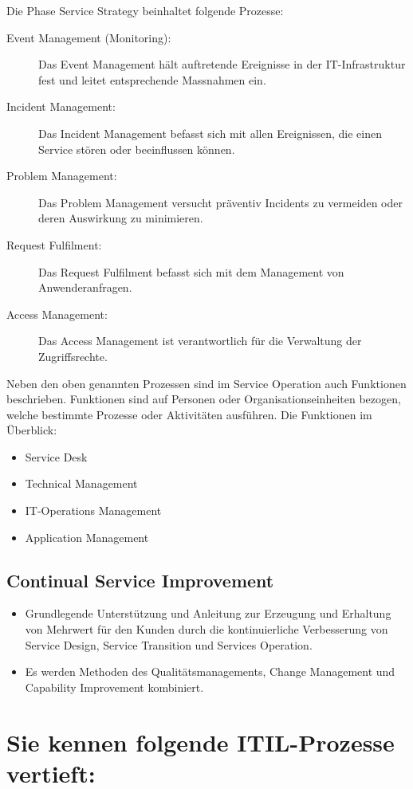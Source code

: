Die Phase Service Strategy beinhaltet folgende Prozesse:
\begin{description}
	\item[Event Management (Monitoring):] Das Event Management hält auftretende Ereignisse in der IT-Infrastruktur fest und leitet entsprechende Massnahmen ein.
	\item[Incident Management:] Das Incident Management befasst sich mit allen Ereignissen, die einen Service stören oder beeinflussen können.
	\item[Problem Management:] Das Problem Management versucht präventiv Incidents zu vermeiden oder deren Auswirkung zu minimieren.
	\item[Request Fulfilment:] Das Request Fulfilment befasst sich mit dem Management von Anwenderanfragen.
	\item[Access Management:] Das Access Management ist verantwortlich für die Verwaltung der Zugriffsrechte.
\end{description}
Neben den oben genannten Prozessen sind im Service Operation auch Funktionen beschrieben. Funktionen sind auf Personen oder Organisationseinheiten bezogen, welche bestimmte Prozesse oder Aktivitäten ausführen. Die Funktionen im Überblick:
\begin{itemize}
	\item Service Desk
	\item Technical Management
    \item IT-Operations Management
	\item Application Management
\end{itemize}

\subsection{Continual Service Improvement}
\begin{itemize}
	\item Grundlegende Unterstützung und Anleitung zur Erzeugung und Erhaltung von Mehrwert für den Kunden durch die kontinuierliche Verbesserung von Service Design, Service Transition und Services Operation.
	\item Es werden Methoden des Qualitätsmanagements, Change Management und Capability Improvement kombiniert.
\end{itemize}


\section{Sie kennen folgende ITIL-Prozesse vertieft:} 

